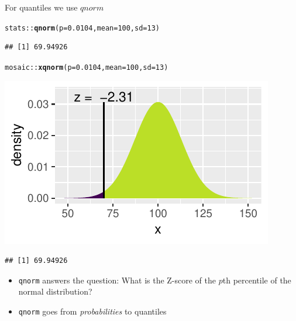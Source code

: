 \documentclass{beamer}\usepackage[]{graphicx}\usepackage[]{color}
\newcommand{\hlnum}[1]{\textcolor[rgb]{0.686,0.059,0.569}{#1}}%
\newcommand{\hlopt}[1]{\textcolor[rgb]{0,0,0}{#1}}%
\newcommand{\hlstd}[1]{\textcolor[rgb]{0.345,0.345,0.345}{#1}}%
\newcommand{\hlkwc}[1]{\textcolor[rgb]{0.333,0.667,0.333}{#1}}%
\newcommand{\hlkwd}[1]{\textcolor[rgb]{0.737,0.353,0.396}{\textbf{#1}}}%
\newenvironment{knitrout}{}{} %
\begin{document}
\begin{frame}[fragile]{For quantiles we use $qnorm$}



\begin{knitrout}\scriptsize
{}\color{fgcolor}
\begin{alltt}
\hlstd{stats}\hlopt{::}\hlkwd{qnorm}\hlstd{(}\hlkwc{p} \hlstd{=} \hlnum{0.0104}\hlstd{,} \hlkwc{mean} \hlstd{=} \hlnum{100}\hlstd{,} \hlkwc{sd} \hlstd{=} \hlnum{13}\hlstd{)}
\end{alltt}
\begin{verbatim}
## [1] 69.94926
\end{verbatim}

\end{knitrout}

\pause 

\begin{knitrout}\scriptsize
{}\color{fgcolor}
\begin{alltt}
\hlstd{mosaic}\hlopt{::}\hlkwd{xqnorm}\hlstd{(}\hlkwc{p} \hlstd{=} \hlnum{0.0104}\hlstd{,} \hlkwc{mean} \hlstd{=} \hlnum{100}\hlstd{,} \hlkwc{sd} \hlstd{=} \hlnum{13}\hlstd{)}
\end{alltt}


{\centering \includegraphics[width=0.6\linewidth]{figure/probs5-1} 

}


\begin{verbatim}
## [1] 69.94926
\end{verbatim}

\end{knitrout}

\pause 

\small{
\begin{itemize}
	\item \texttt{qnorm} answers the question: What is the Z-score of the $p$th percentile of the normal distribution?
		
	\item \texttt{qnorm} goes from \textit{probabilities} to quantiles 
\end{itemize}
}
\end{frame}
\end{document}
